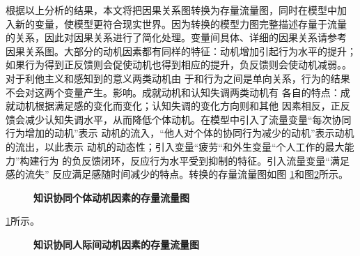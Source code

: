 根据以上分析的结果，本文将把因果关系图转换为存量流量图，同时在模型中加
入新的变量，使模型更符合现实世界。因为转换的模型力图完整描述存量于流量
的关系，因此对因果关系进行了简化处理。变量间具体、详细的因果关系请参考
因果关系图。大部分的动机因素都有同样的特征：动机增加引起行为水平的提升；
如果行为得到正反馈则会促使动机也得到相应的提升，负反馈则会使动机减弱。。对于利他主义和感知到的意义两类动机由
于和行为之间是单向关系，行为的结果不会对这两个变量产生。影响。成就动机和认知失调两类动机有
各自的特点：成就动机根据满足感的变化而变化；认知失调的变化方向则和其他
因素相反，正反馈会减少认知失调水平，从而降低个体动机。在模型中引入了流量变量“每次协同行为增加的动机”表示
动机的流入，“他人对个体的协同行为减少的动机”表示动机的流出，以此表示
动机的动态性；引入变量“疲劳“和外生变量“个人工作的最大能力”构建行为
的负反馈闭环，反应行为水平受到抑制的特征。引入流量变量“满足感的流失”
反应满足感随时间减少的特点。转换的存量流量图如图
\ref{fig:refined-model}和图\ref{fig:refined-model2}所示。
\begin{figure}[!htb]
  \centering
  \caption{\small{\textbf{知识协同个体动机因素的存量流量图}}}
  \label{fig:refined-model}
\end{figure}

\ref{fig:refined-model}所示。
\begin{figure}[!htb]
  \centering
  \caption{\small{\textbf{知识协同人际间动机因素的存量流量图}}}
  \label{fig:refined-model2}
\end{figure}

